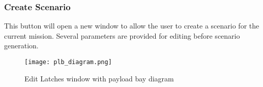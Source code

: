 \documentclass[Space_Shuttle_Vessel_Manual.tex]{subfiles}
\begin{document}
\begin{multicols*}{2}
\subsubsection{Create Scenario}
This button will open a new window to allow the user to create a scenario for the current mission. Several parameters are provided for editing before scenario generation.


\end{multicols*}

\begin{figure}[H]
	\centering
	\captionsetup{justification=centering}
  \texttt{[image: plb\_diagram.png]}
  \caption{Edit Latches window with payload bay diagram}
  \label{fig:plb_diagram}
\end{figure}
\end{document}
